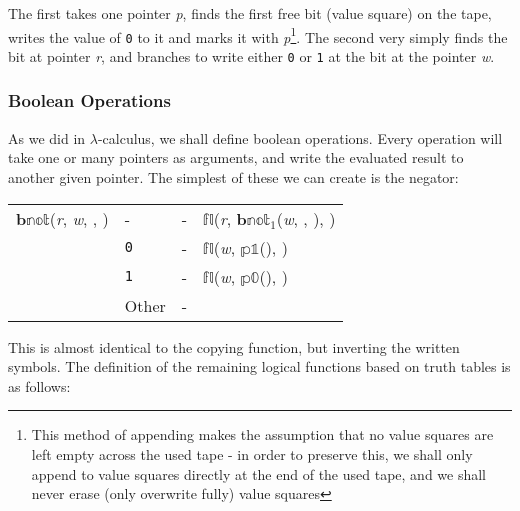 \documentclass[Master.tex]{subfiles}
\begin{document}
\medskip

The first takes one pointer \textit{p}, finds the first free bit (value square) on the tape, writes the value of \texttt{0} to it and marks it with \textit{p}\footnote{This method of appending makes the assumption that no value squares are left empty across the used tape - in order to preserve this, we shall only append to value squares directly at the end of the used tape, and we shall never erase (only overwrite fully) value squares}. The second very simply finds the bit at pointer \textit{r}, and branches to write either \texttt{0} or \texttt{1} at the bit at the pointer \textit{w}.

\subsubsection{Boolean Operations}

As we did in $\lambda$-calculus, we shall define boolean operations. Every operation will take one or many pointers as arguments, and write the evaluated result to another given pointer. The simplest of these we can create is the negator:

\medskip\noindent\begin{tabu} to \textwidth{XXXX}
    $\mathbb{\mathbf{b}not}$(\textit{r}, \textit{w}, , )   & - & - & $\mathbb{fl}$(\textit{r}, $\mathbb{\mathbf{b}not}_1$(\textit{w}, , ), ) \\
    \hhline{----}
     & \texttt{0} & - & $\mathbb{fl}$(\textit{w}, $\mathbb{p1}$(), ) \\
                                                                                       & \texttt{1} & - & $\mathbb{fl}$(\textit{w}, $\mathbb{p0}$(), ) \\ 
                                                                                       & Other & - &  \\
\end{tabu}

\medskip
This is almost identical to the copying function, but inverting the written symbols. The definition of the remaining logical functions based on truth tables is as follows:
\end{document}
